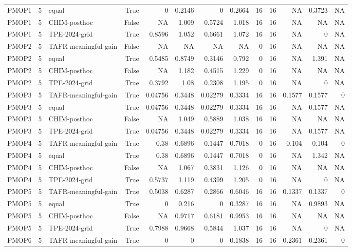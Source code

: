 \begin{tabular}{lrlrrrrrrrrrr}
PMOP1 & 5 & equal & True & 0 & 0.2146 & 0 & 0.2664 & 16 & 16 & NA & 0.3723 & NA \\
PMOP1 & 5 & CHIM-posthoc & False & NA & 1.009 & 0.5724 & 1.018 & 16 & 16 & NA & NA & NA \\
PMOP1 & 5 & TPE-2024-grid & True & 0.8596 & 1.052 & 0.6661 & 1.072 & 16 & 16 & NA & 0 & NA \\
PMOP2 & 5 & TAFR-meaningful-gain & False & NA & NA & NA & NA & 0 & 16 & NA & NA & NA \\
PMOP2 & 5 & equal & True & 0.5485 & 0.8749 & 0.3146 & 0.792 & 0 & 16 & NA & 1.391 & NA \\
PMOP2 & 5 & CHIM-posthoc & False & NA & 1.182 & 0.4515 & 1.229 & 0 & 16 & NA & NA & NA \\
PMOP2 & 5 & TPE-2024-grid & True & 0.3792 & 1.08 & 0.2308 & 1.195 & 0 & 16 & NA & 0 & NA \\
PMOP3 & 5 & TAFR-meaningful-gain & True & 0.04756 & 0.3448 & 0.02279 & 0.3334 & 16 & 16 & 0.1577 & 0.1577 & 0 \\
PMOP3 & 5 & equal & True & 0.04756 & 0.3448 & 0.02279 & 0.3334 & 16 & 16 & NA & 0.1577 & NA \\
PMOP3 & 5 & CHIM-posthoc & False & NA & 1.049 & 0.5889 & 1.038 & 16 & 16 & NA & NA & NA \\
PMOP3 & 5 & TPE-2024-grid & True & 0.04756 & 0.3448 & 0.02279 & 0.3334 & 16 & 16 & NA & 0.1577 & NA \\
PMOP4 & 5 & TAFR-meaningful-gain & True & 0.38 & 0.6896 & 0.1447 & 0.7018 & 0 & 16 & 0.104 & 0.104 & 0 \\
PMOP4 & 5 & equal & True & 0.38 & 0.6896 & 0.1447 & 0.7018 & 0 & 16 & NA & 1.342 & NA \\
PMOP4 & 5 & CHIM-posthoc & False & NA & 1.067 & 0.3831 & 1.126 & 0 & 16 & NA & NA & NA \\
PMOP4 & 5 & TPE-2024-grid & True & 0.5737 & 1.119 & 0.4399 & 1.205 & 0 & 16 & NA & 0 & NA \\
PMOP5 & 5 & TAFR-meaningful-gain & True & 0.5038 & 0.6287 & 0.2866 & 0.6046 & 16 & 16 & 0.1337 & 0.1337 & 0 \\
PMOP5 & 5 & equal & True & 0 & 0.216 & 0 & 0.3287 & 16 & 16 & NA & 0.9893 & NA \\
PMOP5 & 5 & CHIM-posthoc & False & NA & 0.9717 & 0.6181 & 0.9953 & 16 & 16 & NA & NA & NA \\
PMOP5 & 5 & TPE-2024-grid & True & 0.7988 & 0.9668 & 0.5844 & 1.037 & 16 & 16 & NA & 0 & NA \\
PMOP6 & 5 & TAFR-meaningful-gain & True & 0 & 0 & 0 & 0.1838 & 16 & 16 & 0.2361 & 0.2361 & 0 \\

\end{tabular}
